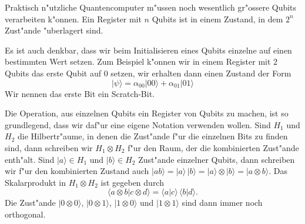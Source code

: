 Praktisch n"utzliche Quantencomputer m"ussen noch wesentlich gr"ossere
Qubits verarbeiten k"onnen.
Ein Register mit $n$ Qubits ist in einem Zustand, in dem $2^n$ Zust"ande
"uberlagert sind.

Es ist auch denkbar, dass wir beim Initialisieren eines Qubits
einzelne auf einen bestimmten Wert setzen.
Zum Beispiel k"onnen wir in einem Register mit $2$ Qubits das erste
Qubit auf $0$ setzen, wir erhalten dann einen Zustand der
Form
\[
|\psi\rangle
=
\alpha_{00}|00\rangle
+
\alpha_{01}|01\rangle
\]
Wir nennen das erste Bit ein Scratch-Bit.

Die Operation, aus einzelnen Qubits ein Register von Qubits zu
machen, ist so grundlegend, dass wir daf"ur eine eigene Notation
verwenden wollen.
Sind $H_1$ und $H_2$ die Hilbertr"aume, in denen die Zust"ande f"ur
die einzelnen Bits zu finden sind, dann schreiben wir $H_1\otimes H_2$
f"ur den Raum, der die kombinierten Zust"ande enth"alt.
Sind $|a\rangle\in H_1$ und $|b\rangle\in H_2$ Zust"ande einzelner
Qubits, dann schreiben wir f"ur den kombinierten Zustand auch
$|ab\rangle=|a\rangle\,|b\rangle=|a\rangle\otimes|b\rangle=|a\otimes b\rangle$.
Das Skalarprodukt in $H_1\otimes H_2$ ist gegeben durch
\[
\langle a\otimes b|c\otimes d\rangle
=
\langle a|c\rangle\,\langle b|d\rangle.
\]
Die Zust"ande $|0\otimes 0\rangle$,
$|0\otimes 1\rangle$,
$|1\otimes 0\rangle$ und
$|1\otimes 1\rangle$ sind dann immer noch orthogonal.

